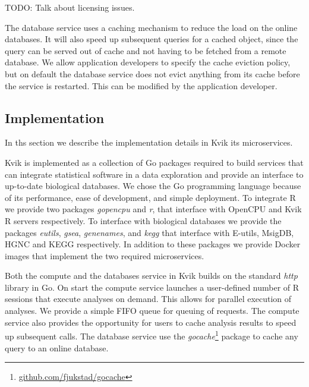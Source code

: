 TODO: Talk about licensing issues. 

The database service uses a caching mechanism to reduce the load on the online
databases. It will also speed up subsequent queries for a cached object, since
the query can be served out of cache and not having to be fetched from a remote
database. 
We allow application developers to specify the cache eviction policy,
but on default the database service does not evict anything from its cache
before the service is restarted. This can be modified by the application
developer. 



\subsection*{Implementation}
In ths section we describe the implementation details in Kvik its
microservices.

Kvik is implemented as a collection of Go packages required to build services
that can integrate statistical
software in a data exploration and provide an interface to up-to-date biological
databases. We chose the Go programming language because of its performance, ease
of development, and simple deployment. 
To integrate R we provide two packages \emph{gopencpu} and
\emph{r}, that interface with OpenCPU and Kvik R servers respectively. To
interface with biological databases we provide the packages \emph{eutils},
\emph{gsea}, \emph{genenames}, and \emph{kegg} that interface with E-utils,
MsigDB, HGNC and KEGG respectively.
In addition to these packages we provide Docker images that implement the
two required microservices. 

Both the compute and the databases service in Kvik builds on the standard
\emph{http} library in Go. On start the compute service 
launches a user-defined number of R sessions that execute analyses on demand.
This allows for parallel execution of analyses. We provide a simple FIFO queue
for queuing of requests. The compute service also provides the opportunity for users to
cache analysis results to speed up subsequent calls. The database service use
the \emph{gocache}\footnote{\url{github.com/fjukstad/gocache}} package to cache
any query to an online database.


